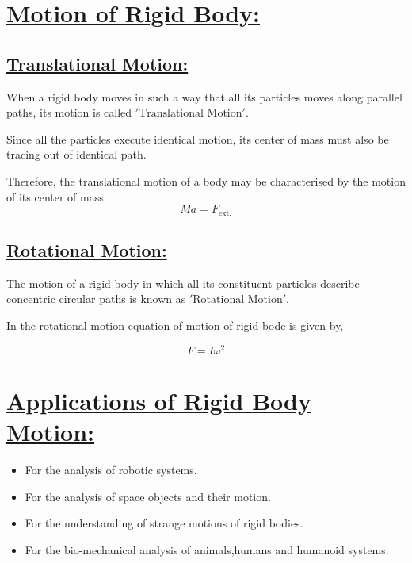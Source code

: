 \documentclass[12pt,a4paper]{article}
\begin{document}
    \vspace*{1.5cm}

    \section*{\underline{Motion of Rigid Body:}}

    \subsection*{\underline{Translational Motion:}}

    When a rigid body moves in such a way that all its particles moves along parallel paths, its motion is called $'\mbox{Translational Motion}'.$

    Since all the particles execute identical motion, its center of mass must also be tracing out of identical path.

    Therefore, the translational motion of a body may be characterised by the motion of its center of mass.
    \[\boxed{Ma = F_{\mbox{ext.}}}\]

    \subsection*{\underline{Rotational Motion:}}

    The motion of a rigid body in which all its constituent particles describe concentric circular paths is known as $'\mbox{Rotational Motion}'.$

    In the rotational motion equation of motion of rigid bode is given by,

    \[\boxed{F = I\omega^2}\]

    \pagebreak

    \section*{\underline{Applications of Rigid Body Motion:}}

    \begin{itemize}
        \item For the analysis of robotic systems.
        \item For the analysis of space objects and their motion.
        \item For the understanding of strange motions of rigid bodies.
        \item For the bio-mechanical analysis of animals,humans and humanoid systems.
    \end{itemize}
\end{document}
